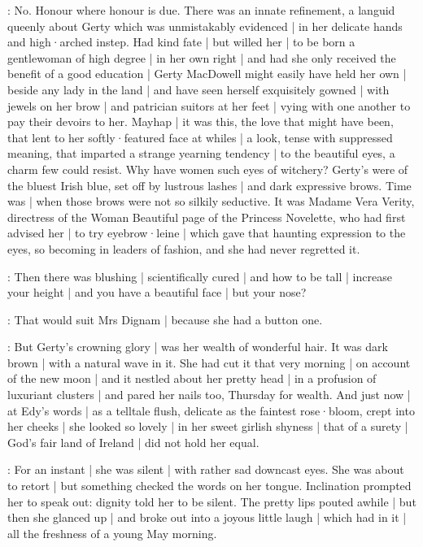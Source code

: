 \gertyNovel:
No.
Honour where honour is due.
There was an innate refinement,
a languid queenly  about Gerty
which was unmistakably evidenced |
in her delicate hands
and high·arched instep.
Had kind fate |
but willed her |
to be born a gentlewoman of high degree |
in her own right |%
and had she only received the benefit of a good education |
Gerty MacDowell might easily have held her own |
beside any lady in the land |
and have seen herself exquisitely gowned |
with jewels on her brow |
and patrician suitors at her feet |
vying with one another to pay their devoirs to her.
Mayhap |
it was this,
the love that might have been,
that lent to her softly·featured face at whiles |
a look,
tense with suppressed meaning,
that imparted a strange yearning tendency |
to the beautiful eyes,
a charm few could resist.
Why have women such eyes of witchery?
Gerty's were of the bluest Irish blue,
set off by lustrous lashes |
and dark expressive brows.
Time was |
when those brows were not so silkily seductive.
It was Madame Vera Verity,%
directress of the Woman Beautiful page of the Princess Novelette,
who had first advised her |
to try eyebrow·leine |
which gave that haunting expression to the eyes,
so becoming in leaders of fashion,
and she had never regretted it.

\gertyReal:
Then there was blushing |
scientifically cured |
and how to be tall |
increase your height |
and you have a beautiful face |
but your nose?

\gertyJudgy:
That would suit Mrs Dignam |
because she had a button one.

\gertyNovel:
But Gerty's crowning glory |
was her wealth of wonderful hair.
It was dark brown |
with a natural wave in it.
She had cut it that very morning |
on account of the new moon |
and it nestled about her pretty head |
in a profusion of luxuriant clusters |
and pared her nails too,
Thursday for wealth.
And just now |
at Edy's words |
as a telltale flush,%
delicate as the faintest rose·bloom,
crept into her cheeks |
she looked so lovely |
in her sweet girlish shyness |
that of a surety |
God's fair land of Ireland |
did not hold her equal.

:
For an instant |
she was silent |
with rather sad downcast eyes.
She was about to retort |
but something checked the words on her tongue.
Inclination prompted her to speak out:
dignity told her to be silent.
The pretty lips pouted awhile |
but then she glanced up |
and broke out into a joyous little laugh |
which had in it |
all the freshness
of a young May morning.

